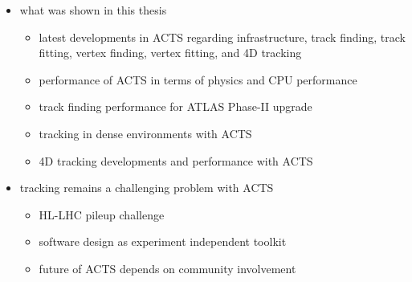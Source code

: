 \begin{itemize}
    \color{red}
    \item what was shown in this thesis
    \begin{itemize}
        \item latest developments in ACTS regarding infrastructure, track finding, track fitting, vertex finding, vertex fitting, and 4D tracking
        \item performance of ACTS in terms of physics and CPU performance
        \item track finding performance for ATLAS Phase-II upgrade
        \item tracking in dense environments with ACTS
        \item 4D tracking developments and performance with ACTS
    \end{itemize}
\end{itemize}

\begin{itemize}
    \color{red}
    \item tracking remains a challenging problem with ACTS
    \begin{itemize}
        \item HL-LHC pileup challenge
        \item software design as experiment independent toolkit
        \item future of ACTS depends on community involvement
    \end{itemize}
\end{itemize}
